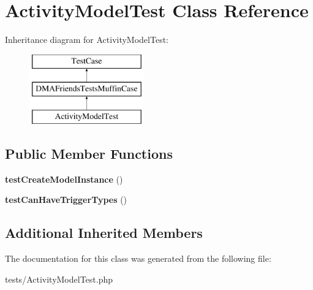 \hypertarget{classActivityModelTest}{\section{Activity\-Model\-Test Class Reference}
\label{classActivityModelTest}
}
Inheritance diagram for Activity\-Model\-Test\-:\begin{figure}[H]
\begin{center}
\leavevmode
\includegraphics[height=3.000000cm]{df/dec/classActivityModelTest}
\end{center}
\end{figure}
\subsection*{Public Member Functions}
\begin{DoxyCompactItemize}
\item 
\hypertarget{classActivityModelTest_a720c01d6a435254ee8f2fd52bd8c4d0c}{{\bfseries test\-Create\-Model\-Instance} ()}\label{classActivityModelTest_a720c01d6a435254ee8f2fd52bd8c4d0c}

\item 
\hypertarget{classActivityModelTest_aae0ab3a31e3faed7f3cf5f850c7d11ca}{{\bfseries test\-Can\-Have\-Trigger\-Types} ()}\label{classActivityModelTest_aae0ab3a31e3faed7f3cf5f850c7d11ca}

\end{DoxyCompactItemize}
\subsection*{Additional Inherited Members}


The documentation for this class was generated from the following file\-:\begin{DoxyCompactItemize}
\item 
tests/Activity\-Model\-Test.\-php\end{DoxyCompactItemize}
